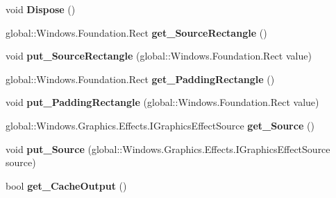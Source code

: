 \begin{DoxyCompactItemize}
void {\bfseries Dispose} ()
\item 
\mbox{\label{class_microsoft_1_1_graphics_1_1_canvas_1_1_effects_1_1_atlas_effect_aef2eff3d4b0a6e08db65a1ec2b79dd7c}} 
global\+::\+Windows.\+Foundation.\+Rect {\bfseries get\+\_\+\+Source\+Rectangle} ()
\item 
\mbox{\label{class_microsoft_1_1_graphics_1_1_canvas_1_1_effects_1_1_atlas_effect_a5b0831a587ccba8f8446c7c800898567}} 
void {\bfseries put\+\_\+\+Source\+Rectangle} (global\+::\+Windows.\+Foundation.\+Rect value)
\item 
\mbox{\label{class_microsoft_1_1_graphics_1_1_canvas_1_1_effects_1_1_atlas_effect_a7e457bab07ec38167bce72c522e34743}} 
global\+::\+Windows.\+Foundation.\+Rect {\bfseries get\+\_\+\+Padding\+Rectangle} ()
\item 
\mbox{\label{class_microsoft_1_1_graphics_1_1_canvas_1_1_effects_1_1_atlas_effect_ab39b71d277811975989494c96fa44eb8}} 
void {\bfseries put\+\_\+\+Padding\+Rectangle} (global\+::\+Windows.\+Foundation.\+Rect value)
\item 
\mbox{\label{class_microsoft_1_1_graphics_1_1_canvas_1_1_effects_1_1_atlas_effect_a137fc0dfdd8f3bd7fa836c902912ad7b}} 
global\+::\+Windows.\+Graphics.\+Effects.\+I\+Graphics\+Effect\+Source {\bfseries get\+\_\+\+Source} ()
\item 
\mbox{\label{class_microsoft_1_1_graphics_1_1_canvas_1_1_effects_1_1_atlas_effect_a5f26925a5df1c7cc2cebea7c7f995d8d}} 
void {\bfseries put\+\_\+\+Source} (global\+::\+Windows.\+Graphics.\+Effects.\+I\+Graphics\+Effect\+Source source)
\item 
\mbox{\label{class_microsoft_1_1_graphics_1_1_canvas_1_1_effects_1_1_atlas_effect_ae6ee5415891e9ad47abc270643df5d9c}} 
bool {\bfseries get\+\_\+\+Cache\+Output} ()

\end{DoxyCompactItemize}
